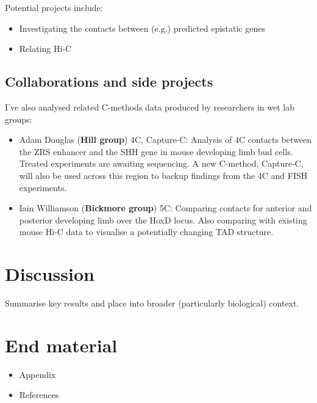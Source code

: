 \documentclass[a4paper,10pt,oneside]{book}
\begin{document}
Potential projects include:

\begin{itemize}
\itemsep1pt\parskip0pt
\item
  Investigating the contacts between (e.g.) predicted epistatic genes
\item
  Relating Hi-C
\end{itemize}

\subsection{Collaborations and side
projects}\label{collaborations-and-side-projects}

I've also analysed related C-methods data produced by researchers in wet
lab groups:

\begin{itemize}
\item
  Adam Douglas (\textbf{Hill group}) 4C, Capture-C: Analysis of 4C
  contacts between the ZRS enhancer and the SHH gene in mouse developing
  limb bud cells. Treated experiments are awaiting sequencing. A new
  C-method, Capture-C, will also be used across this region to backup
  findings from the 4C and FISH experiments.
\item
  Iain Williamson (\textbf{Bickmore group}) 5C: Comparing contacts for
  anterior and posterior developing limb over the HoxD locus. Also
  comparing with existing mouse Hi-C data to visualise a potentially
  changing TAD structure.
\end{itemize}

\section{Discussion}\label{discussion}

Summarise key results and place into broader (particularly biological)
context.

\section{End material}\label{end-material}

\begin{itemize}
\itemsep1pt\parskip0pt
\item
  Appendix
\item
  References
\end{itemize}


\begin{small}

\end{small}
\end{document}
